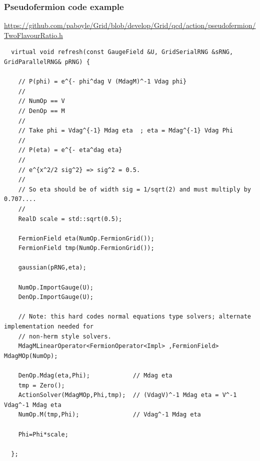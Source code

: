 \documentclass[pdf,ps,8pt]{beamer}
\newcommand{\link}[1]{\href{#1}{ {\color{blue} #1} }}
\begin{document}
\begin{frame}[fragile]\small\frametitle{ Pseudofermion code example }

\link{https://github.com/paboyle/Grid/blob/develop/Grid/qcd/action/pseudofermion/TwoFlavourRatio.h}
  {  \tiny
\begin{verbatim}
  virtual void refresh(const GaugeField &U, GridSerialRNG &sRNG, GridParallelRNG& pRNG) {

    // P(phi) = e^{- phi^dag V (MdagM)^-1 Vdag phi}
    //
    // NumOp == V
    // DenOp == M
    //
    // Take phi = Vdag^{-1} Mdag eta  ; eta = Mdag^{-1} Vdag Phi
    //
    // P(eta) = e^{- eta^dag eta}
    //
    // e^{x^2/2 sig^2} => sig^2 = 0.5.
    // 
    // So eta should be of width sig = 1/sqrt(2) and must multiply by 0.707....
    //
    RealD scale = std::sqrt(0.5);

    FermionField eta(NumOp.FermionGrid());
    FermionField tmp(NumOp.FermionGrid());

    gaussian(pRNG,eta);

    NumOp.ImportGauge(U);
    DenOp.ImportGauge(U);

    // Note: this hard codes normal equations type solvers; alternate implementation needed for 
    // non-herm style solvers.
    MdagMLinearOperator<FermionOperator<Impl> ,FermionField> MdagMOp(NumOp);

    DenOp.Mdag(eta,Phi);            // Mdag eta
    tmp = Zero();
    ActionSolver(MdagMOp,Phi,tmp);  // (VdagV)^-1 Mdag eta = V^-1 Vdag^-1 Mdag eta
    NumOp.M(tmp,Phi);               // Vdag^-1 Mdag eta

    Phi=Phi*scale;
	
  };
\end{verbatim}
}
\end{frame}
\end{document}
